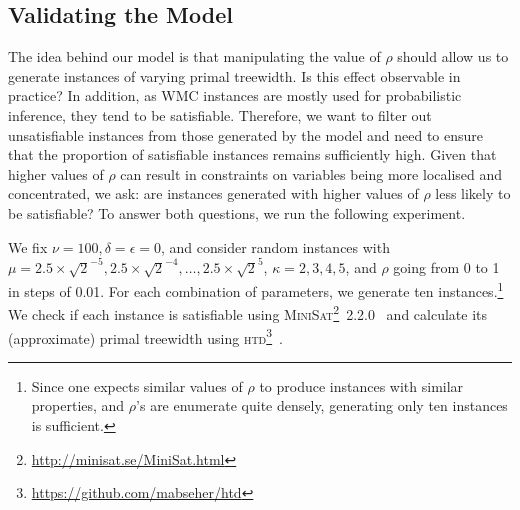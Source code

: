 \documentclass[runningheads]{llncs}
\begin{document}




\subsection{Validating the Model}\label{sec:remarks}

The idea behind our model is that manipulating the value of $\rho$ should allow
us to generate instances of varying primal treewidth. Is this effect observable
in practice? In addition, as \textsf{WMC} instances are mostly used for
probabilistic inference, they tend to be satisfiable. Therefore, we want to
filter out unsatisfiable instances from those generated by the model and need to
ensure that the proportion of satisfiable instances remains sufficiently high.
Given that higher values of $\rho$ can result in constraints on variables being
more localised and concentrated, we ask: are instances generated with higher
values of $\rho$ less likely to be satisfiable? To answer both questions, we run
the following experiment.

\begin{experiment}\label{exp:regular_satisfiability}
  We fix $\nu = 100, \delta = \epsilon = 0$, and consider random instances with
  $\mu = 2.5 \times \sqrt{2}^{-5}, 2.5 \times \sqrt{2}^{-4}, \dots, 2.5 \times \sqrt{2}^5$,
  $\kappa = 2, 3, 4, 5$, and $\rho$ going from 0 to 1 in steps of 0.01. For each
  combination of parameters, we generate ten instances.\footnote{Since one
    expects similar values of $\rho$ to produce instances with similar
    properties, and $\rho$'s are enumerate quite densely, generating only ten
    instances is sufficient.} We check if each instance is satisfiable using
  \textsc{MiniSat}\footnote{\url{http://minisat.se/MiniSat.html}}~2.2.0~\cite{DBLP:conf/sat/EenS03}
  and calculate its (approximate) primal treewidth using
  \textsc{htd}\footnote{\url{https://github.com/mabseher/htd}}~\cite{DBLP:conf/cpaior/AbseherMW17}.
\end{experiment}
\end{document}
